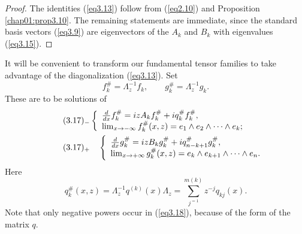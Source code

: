 \documentclass{surv-l}
\theoremstyle{plain}
\theoremstyle{definition}
\numberwithin{equation}{chapter}
\begin{document}
\begin{proof}
The identities (\ref{eq3.13}) follow from (\ref{eq2.10}) and Proposition \ref{chap01:prop3.10}. The remaining statements are immediate, since the standard basis vectors (\ref{eq3.9}) are eigenvectors of the $A_{k}$ and $B_{k}$ with eigenvalues (\ref{eq3.15}).
\end{proof}
It will be convenient to transform our fundamental tensor families to take advantage of the diagonalization (\ref{eq3.13}). Set
\begin{equation}\label{eq3.16}
f_{k}^{\#}=\Lambda_{z}^{-1}f_{k},\qquad g_{k}^{\#}=\Lambda_{z}^{-1}g_{k}.
\end{equation}
These are to be solutions of
\begin{align*}\label{eq3.17-}
&\tag*{$(3.17)_{-}$} \left\{\begin{array}{ll}
\frac{d}{dx}f_{k}^{\#}=izA_{k}f_{k}^{\#}+iq_{k}^{\#}f_{k}^{\#},\\\nonumber
\lim_{x\rightarrow-\infty}f_{k}^{\#}(x, z)=e_{1}\wedge e_{2}\wedge\cdots \wedge e_{k};
\end{array}\right.\\ \nonumber
&\tag*{$(3.17)_{+}$}  \quad \left\{\begin{array}{ll}
\frac{d}{dx}g_{k}^{\#}=izB_{k}g_{k}^{\#}+iq_{n-k+1}^{\#}g_{k}^{\#},\\ \nonumber
\lim_{x\rightarrow+\infty}g_{k}^{\#} (x, z)=e_{k}\wedge e_{k+1}\wedge\cdots\wedge e_{n}.
\end{array}\right.\\
\end{align*}
Here
\setcounter{equation}{17}
\begin{equation}\label{eq3.18}
q_{k}^{\#}(x, z)=\Lambda_{z}^{-1}q^{(k)}(x)\Lambda_{z}=\sum_{j^{=1}}^{m(k)}z^{-j}q_{kj}(x).
\end{equation}
Note that only negative powers occur in (\ref{eq3.18}), because of the form of the matrix $q$.
\end{document}
